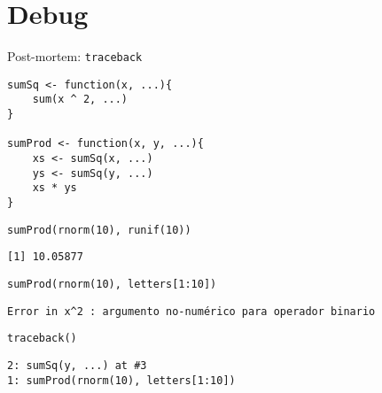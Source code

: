 \documentclass[xcolor={usenames,svgnames,dvipsnames}]{beamer}
\begin{document}
\section{Debug}
\label{sec:orgf3ffc69}

\begin{frame}[label={sec:org58d1523},fragile]{Post-mortem: \texttt{traceback}}
 \lstset{language=r,label= ,caption= ,captionpos=b,numbers=none}
\begin{lstlisting}
sumSq <- function(x, ...){
    sum(x ^ 2, ...)
}

sumProd <- function(x, y, ...){
    xs <- sumSq(x, ...)
    ys <- sumSq(y, ...)
    xs * ys
}
\end{lstlisting}

\lstset{language=r,label= ,caption= ,captionpos=b,numbers=none}
\begin{lstlisting}
sumProd(rnorm(10), runif(10))
\end{lstlisting}

\begin{verbatim}
[1] 10.05877
\end{verbatim}


\lstset{language=r,label= ,caption= ,captionpos=b,numbers=none}
\begin{lstlisting}
sumProd(rnorm(10), letters[1:10])
\end{lstlisting}

\begin{verbatim}
Error in x^2 : argumento no-numérico para operador binario
\end{verbatim}


\lstset{language=r,label= ,caption= ,captionpos=b,numbers=none}
\begin{lstlisting}
traceback()
\end{lstlisting}

\begin{verbatim}
2: sumSq(y, ...) at #3
1: sumProd(rnorm(10), letters[1:10])
\end{verbatim}
\end{frame}
\end{document}
